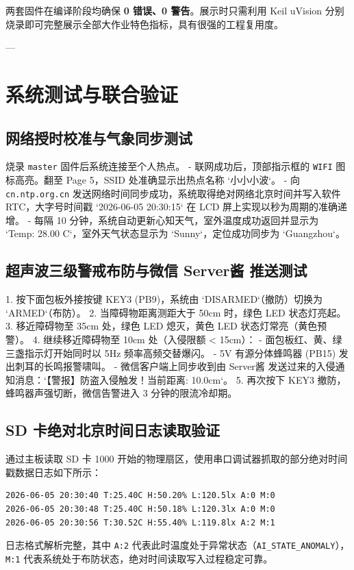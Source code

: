\documentclass[11pt,a4paper]{ctexart}
\begin{document}
两套固件在编译阶段均确保 \textbf{0 错误、0 警告}。展示时只需利用 Keil uVision 分别烧录即可完整展示全部大作业特色指标，具有很强的工程复用度。

---

\section{系统测试与联合验证}

\subsection{网络授时校准与气象同步测试}
烧录 \texttt{master} 固件后系统连接至个人热点。
- 联网成功后，顶部指示框的 \texttt{WIFI} 图标高亮。翻至 Page 5，SSID 处准确显示出热点名称 `小小小波`。
- 向 \texttt{cn.ntp.org.cn} 发送网络时间同步成功，系统取得绝对网络北京时间并写入软件 RTC，大字号时间戳 `2026-06-05 20:30:15` 在 LCD 屏上实现以秒为周期的准确递增。
- 每隔 10 分钟，系统自动更新心知天气，室外温度成功返回并显示为 `Temp: 28.00 C`，室外天气状态显示为 `Sunny`，定位成功同步为 `Guangzhou`。

\subsection{超声波三级警戒布防与微信 Server酱 推送测试}
1. 按下面包板外接按键 KEY3 (PB9)，系统由 `DISARMED`（撤防）切换为 `ARMED`（布防）。
2. 当障碍物距离测距大于 50cm 时，绿色 LED 状态灯亮起。
3. 移近障碍物至 35cm 处，绿色 LED 熄灭，黄色 LED 状态灯常亮（黄色预警）。
4. 继续移近障碍物至 10cm 处（入侵限额 < 15cm）：
   - 面包板红、黄、绿三盏指示灯开始同时以 5Hz 频率高频交替爆闪。
   - 5V 有源分体蜂鸣器 (PB15) 发出刺耳的长鸣报警啸叫。
   - 微信客户端上同步收到由 Server酱 发送过来的入侵通知消息：`【警报】防盗入侵触发！当前距离: 10.0cm`。
5. 再次按下 KEY3 撤防，蜂鸣器声强切断，微信告警进入 3 分钟的限流冷却期。

\subsection{SD 卡绝对北京时间日志读取验证}
通过主板读取 SD 卡 1000 开始的物理扇区，使用串口调试器抓取的部分绝对时间戳数据日志如下所示：
\begin{lstlisting}[style=cstyle]
2026-06-05 20:30:40 T:25.40C H:50.20% L:120.5lx A:0 M:0
2026-06-05 20:30:48 T:25.40C H:50.18% L:120.3lx A:0 M:0
2026-06-05 20:30:56 T:30.52C H:55.40% L:119.8lx A:2 M:1
\end{lstlisting}
日志格式解析完整，其中 \texttt{A:2} 代表此时温度处于异常状态（\texttt{AI\_STATE\_ANOMALY}），\texttt{M:1} 代表系统处于布防状态，绝对时间读取写入过程稳定可靠。
\end{document}
